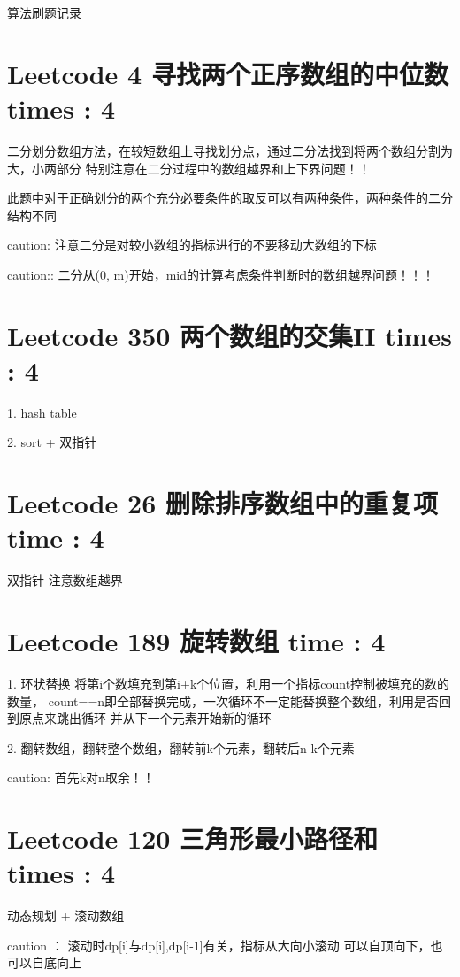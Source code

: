 \documentclass[UTF8]{ctexart}
\begin{document}
算法刷题记录


\section{Leetcode 4 寻找两个正序数组的中位数 times : 4}
二分划分数组方法，在较短数组上寻找划分点，通过二分法找到将两个数组分割为大，小两部分
特别注意在二分过程中的数组越界和上下界问题！！

此题中对于正确划分的两个充分必要条件的取反可以有两种条件，两种条件的二分结构不同

caution: 注意二分是对较小数组的指标进行的不要移动大数组的下标

caution:: 二分从(0, m)开始，mid的计算考虑条件判断时的数组越界问题！！！


\section{Leetcode 350 两个数组的交集II times : 4}
1. hash table

2. sort + 双指针

\section{Leetcode 26 删除排序数组中的重复项 time : 4}
双指针
注意数组越界

\section{Leetcode 189 旋转数组 time : 4}
1. 环状替换 将第i个数填充到第i+k个位置，利用一个指标count控制被填充的数的数量，
count==n即全部替换完成，一次循环不一定能替换整个数组，利用是否回到原点来跳出循环
并从下一个元素开始新的循环

2. 翻转数组，翻转整个数组，翻转前k个元素，翻转后n-k个元素

caution: 首先k对n取余！！

\section{Leetcode 120 三角形最小路径和 times : 4}
动态规划 + 滚动数组

caution ： 滚动时dp[i]与dp[i],dp[i-1]有关，指标从大向小滚动
可以自顶向下，也可以自底向上
\end{document}
